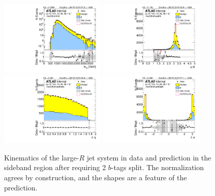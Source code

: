 \begin{figure}[htbp!]
\begin{center}
\includegraphics[angle=270, width=0.45\textwidth]{./figures/boosted/Sideband/b77_TwoTag_split_Sideband_mHH_l_1.pdf}
\includegraphics[angle=270, width=0.45\textwidth]{./figures/boosted/Sideband/b77_TwoTag_split_Sideband_hCandDr.pdf}\\
\includegraphics[angle=270, width=0.45\textwidth]{./figures/boosted/Sideband/b77_TwoTag_split_Sideband_hCandDeta.pdf}
\includegraphics[angle=270, width=0.45\textwidth]{./figures/boosted/Sideband/b77_TwoTag_split_Sideband_hCandDphi.pdf}
  \caption{Kinematics of the large-$R$ jet system in data and prediction in the sideband region after requiring 2 $b$-tags split. The normalization agrees by construction, and the shapes are a feature of the prediction. }
  \label{fig:boosted-2bs-sideband-ak10-system}
\end{center}
\end{figure}

